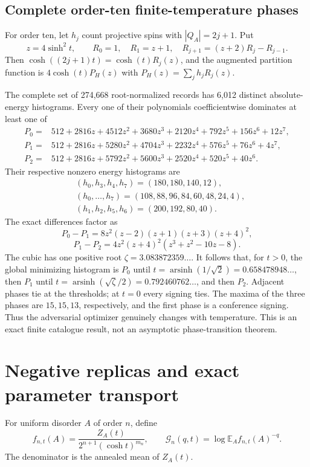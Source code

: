 \documentclass[11pt]{article}
\begin{document}
\subsection{Complete order-ten finite-temperature phases}

For order ten, let $h_j$ count projective spins with
$|Q_A|=2j+1$.  Put
\[
 z=4\sinh^2t,\qquad R_0=1,\quad R_1=z+1,\quad
 R_{j+1}=(z+2)R_j-R_{j-1}.
\]
Then $\cosh((2j+1)t)=\cosh(t)R_j(z)$, and the augmented partition
function is $4\cosh(t)P_H(z)$ with
$P_H(z)=\sum_jh_jR_j(z)$.

The complete set of 274,668 root-normalized records has 6,012 distinct
absolute-energy histograms.  Every one of their polynomials
coefficientwise dominates at least one of
\[
\begin{aligned}
P_0={}&512+2816z+4512z^2+3680z^3+2120z^4+792z^5+156z^6+12z^7,\\
P_1={}&512+2816z+5280z^2+4704z^3+2232z^4+576z^5+76z^6+4z^7,\\
P_2={}&512+2816z+5792z^2+5600z^3+2520z^4+520z^5+40z^6.
\end{aligned}
\]
Their respective nonzero energy histograms are
\[
\begin{aligned}
&(h_0,h_3,h_4,h_7)=(180,180,140,12),\\
&(h_0,\ldots,h_7)=(108,88,96,84,60,48,24,4),\\
&(h_1,h_2,h_5,h_6)=(200,192,80,40).
\end{aligned}
\]
The exact differences factor as
\[
 P_0-P_1=8z^2(z-2)(z+1)(z+3)(z+4)^2,
\]
\[
 P_1-P_2=4z^2(z+4)^2(z^3+z^2-10z-8).
\]
The cubic has one positive root
$\zeta=3.083872359\ldots$.  It follows that, for $t>0$, the global
minimizing histogram is $P_0$ until
$t=\operatorname{arsinh}(1/\sqrt2)=0.658478948\ldots$, then $P_1$ until
$t=\operatorname{arsinh}(\sqrt\zeta/2)=0.792460762\ldots$, and then
$P_2$.  Adjacent phases tie at the thresholds; at $t=0$ every signing ties.
The maxima of the three phases are $15,15,13$, respectively, and the first
phase is a conference signing.  Thus the adversarial optimizer genuinely
changes with temperature.  This is an exact finite catalogue result, not an
asymptotic phase-transition theorem.

\section{Negative replicas and exact parameter transport}

For uniform disorder $A$ of order $n$, define
\[
 f_{n,t}(A)=\frac{Z_A(t)}{2^{n+1}(\cosh t)^{m_n}},
 \qquad
 \mathcal G_n(q,t)=\log\mathbb E_A f_{n,t}(A)^{-q}.
\]
The denominator is the annealed mean of $Z_A(t)$.
\end{document}
